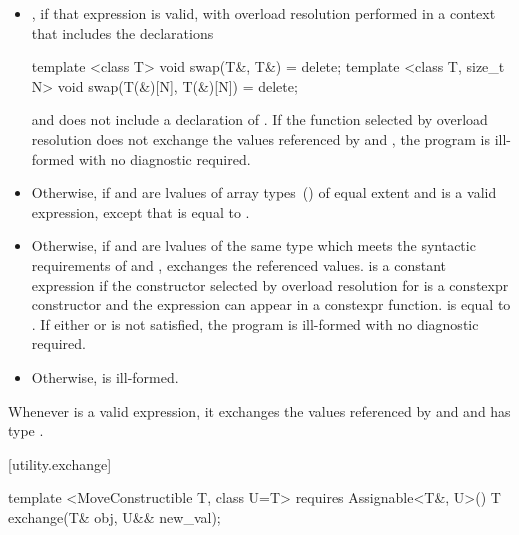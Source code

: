 \begin{itemize}
\item
  , if that expression is valid, with overload resolution
  performed in a context that includes the declarations
\begin{codeblock}
  template <class T>
  void swap(T&, T&) = delete;
  template <class T, size_t N>
  void swap(T(&)[N], T(&)[N]) = delete;
\end{codeblock}
  and does not include a declaration of .
  If the function selected by overload resolution does not
  exchange the values referenced by  and ,
  the program is ill-formed with no diagnostic required.

\item
  Otherwise,  if  and
   are lvalues of array types~()
  of equal extent and 
  is a valid expression, except that
   is equal to
  .

\item
  Otherwise, if  and  are lvalues of the
  same type  which meets the syntactic requirements of
   and
  , exchanges the referenced values.
   is a constant expression if
  the constructor selected by overload resolution for
   is a constexpr constructor and
  the expression  can appear in a
  constexpr function. 
  is equal to . If either
   or
   is not satisfied, the program
  is ill-formed with no diagnostic required.

\item
  Otherwise,  is ill-formed.
\end{itemize}

\pnum
\remark Whenever  is a valid
expression, it exchanges the values referenced by 
and  and has type .

[utility.exchange]{}

\begin{itemdecl}
template <MoveConstructible T, class U=T>
  requires Assignable<T&, U>()
T exchange(T& obj, U&& new_val);
\end{itemdecl}


